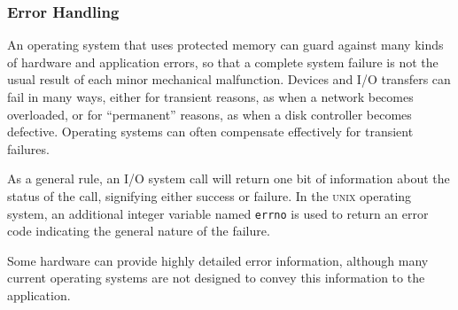 \subsubsection{Error Handling}\label{subsubsec:IO_Error_Handling}
An operating system that uses protected memory can guard against many kinds of hardware and application errors, so that a complete system failure is not the usual result of each minor mechanical malfunction.
Devices and I/O transfers can fail in many ways, either for transient reasons, as when a network becomes overloaded, or for ``permanent'' reasons, as when a disk controller becomes defective.
Operating systems can often compensate effectively for transient failures.

As a general rule, an I/O system call will return one bit of information about the status of the call, signifying either success or failure.
In the \textsc{unix} operating system, an additional integer variable named \texttt{errno} is used to return an error code indicating the general nature of the failure.

Some hardware can provide highly detailed error information, although many current operating systems are not designed to convey this information to the application.


